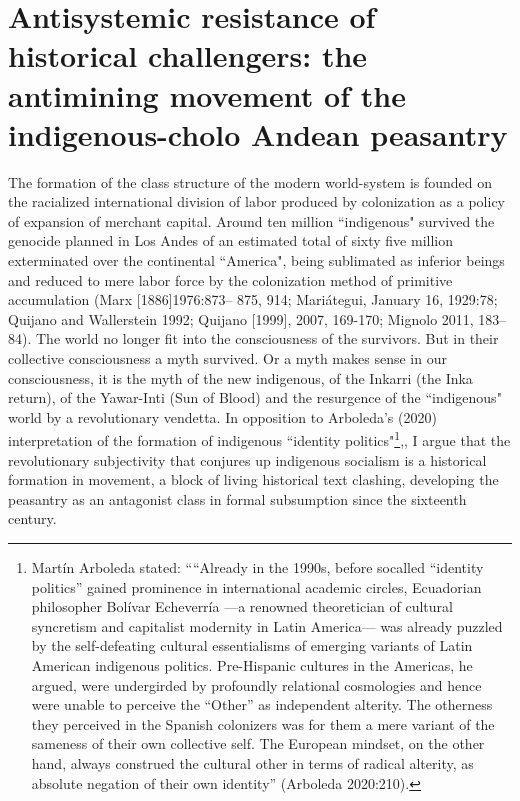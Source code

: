 \documentclass[]{interact}
\theoremstyle{plain}%
\theoremstyle{definition}
\theoremstyle{remark}
\begin{document}
\section{Antisystemic resistance of historical challengers: the antimining movement of the indigenous-cholo Andean peasantry}
The formation of the class structure of the modern world-system is founded on the racialized international division of labor produced by colonization as a policy of expansion of merchant capital. Around ten million “indigenous" survived the genocide planned in Los Andes of an estimated total of sixty five million exterminated over the continental “America", being sublimated as inferior beings and reduced to mere labor force by the colonization method of primitive accumulation (Marx [1886]1976:873– 875, 914; Mariátegui, January 16, 1929:78; Quijano and Wallerstein 1992; Quijano [1999], 2007, 169-170; Mignolo 2011, 183–84).
The world no longer fit into the consciousness of the survivors. But in their collective consciousness a myth survived. Or a myth makes sense in our consciousness, it is the myth of the new indigenous, of the Inkarri (the Inka return), of the Yawar-Inti (Sun of Blood) and the resurgence of the “indigenous" world by a revolutionary vendetta. In opposition to Arboleda's (2020) interpretation of the formation of indigenous “identity politics"\footnote{Martín Arboleda stated: ““Already in the 1990s, before socalled “identity politics” gained prominence in international academic circles, Ecuadorian philosopher Bolívar Echeverría —a renowned theoretician of cultural syncretism and capitalist modernity in Latin America— was already puzzled by the self-defeating cultural essentialisms of emerging variants of Latin American indigenous politics. Pre-Hispanic cultures in the Americas, he argued, were undergirded by profoundly relational cosmologies and hence were unable to perceive the “Other” as independent alterity. The otherness they perceived in the Spanish colonizers was for them a mere variant of the sameness of their own collective self. The European mindset, on the other hand, always construed the cultural other in terms of radical alterity, as absolute negation of their own identity” (Arboleda 2020:210).},, I argue that the revolutionary subjectivity that conjures up indigenous socialism is a historical formation in movement, a block of living historical text clashing, developing the peasantry as an antagonist class in formal subsumption since the sixteenth century.
\end{document}
